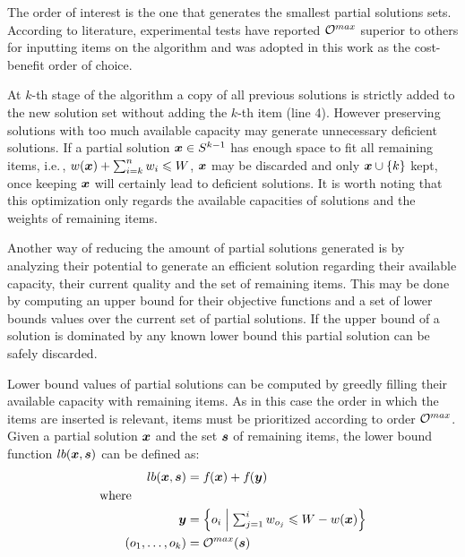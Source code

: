 The order of interest is the one that generates the smallest partial solutions sets.
According to literature, experimental tests have reported $\mathcal{O}^{max}$
superior to others for inputting items on the algorithm and was adopted
in this work as the cost-benefit order of choice.

\label{subsec:deficient}
At $k$-th stage of the algorithm
a copy of all previous solutions is strictly added to the
new solution set without adding the $k$-th item (line 4).
However preserving solutions with too much available capacity
may generate unnecessary deficient solutions.
If a partial solution $\boldsymbol{x} \in S^{k-1}$ has enough
space to fit all remaining items, i.e.\,, $w(\boldsymbol{x}) + \sum_{i=k}^n w_i \leqslant W$,
$\boldsymbol{x}$ may be discarded and only $\boldsymbol{x} \cup \{k\}$ kept, once
keeping $\boldsymbol{x}$ will certainly lead to deficient solutions.
It is worth noting that this optimization only regards the available capacities of solutions
and the weights of remaining items.


\label{subsec:unpromissing}
Another way of reducing the amount of partial solutions
generated is by analyzing their potential to generate an efficient solution
regarding their available capacity, their current quality and the set of remaining items.
This may be done by computing an upper bound for their objective functions
and a set of lower bounds values over the current set of partial solutions.
If the upper bound of a solution is dominated by any known lower bound
this partial solution can be safely discarded.

Lower bound values of partial solutions can be computed by greedly filling
their available capacity with remaining items.
As in this case the order in which the items are inserted is relevant, 
items must be prioritized according to order $\mathcal{O}^{max}$.
Given a partial solution $\boldsymbol{x}$ and the set $\boldsymbol{s}$ of remaining items,
the lower bound function $lb(\boldsymbol{x}, \boldsymbol{s})$ can be defined as:
\begin{align*}
    lb(\boldsymbol{x}, \boldsymbol{s}) &= f_{}(\boldsymbol{x}) + f_{}(\boldsymbol{y}) \\
  \text{where} \phantom{mmmmm} \\
    \boldsymbol{y} &= \left\{ o_i \;\middle|\; \textstyle\sum_{j=1}^i w_{o_j} \leqslant W - w(\boldsymbol{x}) \right\} \\
    (o_1, \ldots, o_k) &= \mathcal{O}^{max}(\boldsymbol{s})
\end{align*}


